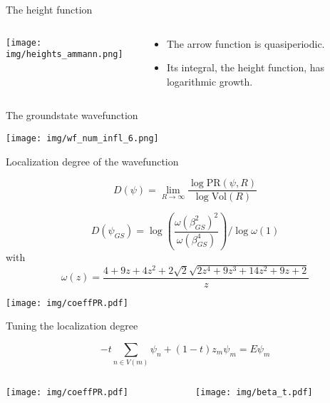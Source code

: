 \documentclass[xcolor=x11names,compress,professionalfonts]{beamer}
\renewcommand{\(}{\begin{columns}}
\renewcommand{\)}{\end{columns}}
\newcommand{\<}[1]{\begin{column}{#1}}
\renewcommand{\>}{\end{column}}
\begin{document}
\begin{frame}{The height function}

\begin{columns}

\begin{column}{8cm}
{\centering
\texttt{[image: img/heights\_ammann.png]}

}
\end{column}

\begin{column}{4cm}

\begin{itemize}
	\item The arrow function is quasiperiodic.
	\item Its integral, the height function, has logarithmic growth.
\end{itemize}
\end{column}
\end{columns}

\end{frame}

\begin{frame}{The groundstate wavefunction}

{\centering
\texttt{[image: img/wf\_num\_infl\_6.png]}

}

\end{frame}

\begin{frame}{Localization degree of the wavefunction}

\[
D(\psi) = \lim_{R \to \infty} \frac{\log \text{PR}(\psi,R)}{\log \text{Vol}(R)}
\]

\[
D(\psi_{GS}) = \log\left( \frac{\omega(\beta_{GS}^2)^2}{\omega(\beta_{GS}^4)}\right)/\log \omega(1)
\]
with 
\[ 
\omega(z) = \frac{4 +9 z + 4 z^2+2 \sqrt{2} \sqrt{2 z^4+9 z^3+14 z^2+9 z+2}}{z}
\]

{\centering
\texttt{[image: img/coeffPR.pdf]}

}

\end{frame}

\begin{frame}{Tuning the localization degree}

\[
-t \sum_{n \in V(m)} \psi_n + (1-t)z_m \psi_m = E \psi_m
\]

\begin{columns}
\begin{column}{5cm}
\texttt{[image: img/coeffPR.pdf]}
\end{column}

\begin{column}{5cm}
\texttt{[image: img/beta\_t.pdf]}
\end{column}

\end{columns}

\end{frame}
\end{document}
